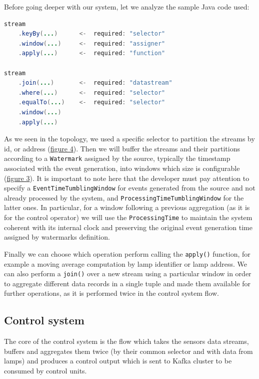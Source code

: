 Before going deeper with our system, let we analyze the sample Java code used:
\begin{lstlisting}[language=Java,basicstyle=\small]
stream
    .keyBy(...)      <-  required: "selector"
    .window(...)     <-  required: "assigner"
    .apply(...)      <-  required: "function"

stream
    .join(...)       <-  required: "datastream"
    .where(...)      <-  required: "selector"
    .equalTo(...)    <-  required: "selector"
    .window(...)
    .apply(...)
\end{lstlisting}
As we seen in the topology, we used a specific selector to partition the streams by id, or address (\hyperref[fig:ember_operator]{figure 4}).  Then we will buffer the streams and their partitions according to a \texttt{Watermark} assigned by the source, typically the timestamp associated with the event generation, into windows which size is configurable (\hyperref[fig:flink_windows]{figure 3}). It is important to note here that the developer must pay attention to specify a \texttt{EventTimeTumblingWindow} for events generated from the source and not already processed by the system, and \texttt{ProcessingTimeTumblingWindow} for the latter ones. In particular, for a window following a previous aggregation (as it is for the control operator) we will use the \texttt{ProcessingTime} to maintain the system coherent with its internal clock and preserving the original event generation time assigned by watermarks definition.

Finally we can choose which operation perform calling the \texttt{apply()} function, for example a moving average computation by lamp identifier or lamp address. We can also perform a \texttt{join()} over a new stream using a particular window in order to aggregate different data records in a single tuple and made them available for further operations, as it is performed twice in the control system flow.

\subsection{Control system}
The core of the control system is the flow which takes the sensors data streams, buffers and aggregates them twice (by their common selector and with data from lamps) and produces a control output which is sent to Kafka cluster to be consumed by control units.

